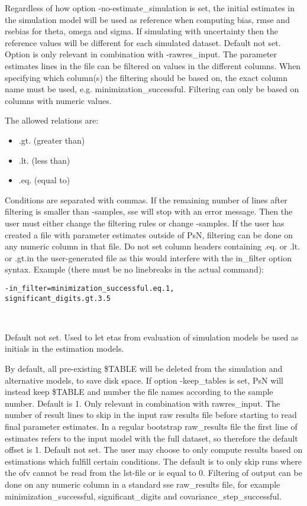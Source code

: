 \begin{optionlist}
Regardless of how option -no-estimate\_simulation is set, the initial estimates in the simulation model will be used as reference when computing bias, rmse and rsebias for theta, omega and sigma. If simulating with uncertainty then the reference values will be different for each simulated dataset. 
\nextopt
{}
Default not set. Option is only relevant in combination with -rawres\_input. The parameter estimates lines in the file can be filtered on values in the different columns. When specifying which column(s) the filtering should be based on, the exact column name must be used, e.g. minimization\_successful. Filtering can only be based on columns with numeric values. 

The allowed relations are:
\begin{itemize}
	\item .gt. (greater than)
	\item .lt. (less than)
	\item .eq. (equal to)
\end{itemize}
Conditions are separated with commas. If the remaining number of lines after filtering is smaller than -samples,  sse will stop with an error message. Then the user must either change the filtering rules or change -samples. If the user has created a file with parameter estimates outside of PsN, filtering can be done on any numeric column in that file. Do not set column headers containing .eq. or .lt. or .gt.in the user-generated file as this would interfere with the in\_filter option syntax.
\newpage
Example (there must be no linebreaks in the actual command):
\begin{verbatim}
-in_filter=minimization_successful.eq.1,
significant_digits.gt.3.5
\end{verbatim} \\
\nextopt

    Default not set. Used to let etas from evaluation of
    simulation models be used as initials in the estimation models.
\nextopt

By default, all pre-existing \$TABLE will be deleted from the simulation and alternative models, to save disk space. If option -keep\_tables is set, 
PsN will instead keep \$TABLE and number the file names according to the sample number.
\nextopt
{}
Default is 1. Only relevant in combination with rawres\_input. The number of result lines to skip in the input raw results file before starting to read final parameter estimates. In a regular bootstrap raw\_results file the first line of estimates refers to the input model with the full dataset, so therefore the default offset is 1.
\nextopt
{}
Default not set. The user may choose to only compute results based on estimations which fulfill certain conditions. The default is to only skip runs where the ofv cannot be read from the lst-file or is equal to 0. Filtering of output can be done on any numeric column in a standard sse raw\_results file, for example minimization\_successful, significant\_digits 
and covariance\_step\_successful. 


\end{optionlist}
